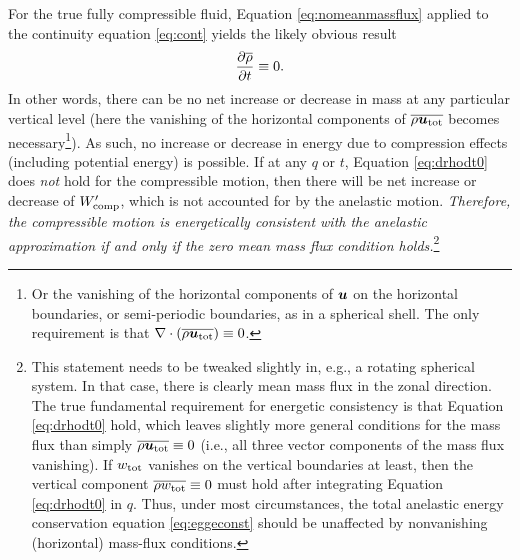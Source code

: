 \documentclass[12pt]{article}
\newcommand{\utot}{{\vecu}_{\rm tot}}
\newcommand{\uwtot}{w_{\rm tot}}
\newcommand{\wpcomp}{W^\prime_{\rm comp}}
\begin{document}
For the true fully compressible fluid, Equation \eqref{eq:nomeanmassflux} applied to the continuity equation \eqref{eq:cont} yields the likely obvious result
\begin{align}\label{eq:drhodt0}
	\frac{\partial\overline{\rho}}{\partial t}\equiv0.
\end{align}
In other words, there can be no net increase or decrease in mass at any particular vertical level (here the vanishing of the horizontal components of $\overline{\rho\utot}$ becomes necessary\footnote{Or the vanishing of the horizontal components of $\bm{u}$ on the horizontal boundaries, or semi-periodic boundaries, as in a spherical shell. The only requirement is that $\Div(\overline{\rho\utot})\equiv0$.}). As such, no increase or decrease in energy due to compression effects (including potential energy) is possible. If at any $q$ or $t$, Equation \eqref{eq:drhodt0} does \textit{not} hold for the compressible motion, then there will be net increase or decrease of $\wpcomp$, which is not accounted for by the anelastic motion. \textit{Therefore, the compressible motion is energetically consistent with the anelastic approximation if and only if the zero mean mass flux condition holds.}\footnote{This statement needs to be tweaked slightly in, e.g., a rotating spherical system. In that case, there is clearly mean mass flux in the zonal direction. The true fundamental requirement for energetic consistency is that Equation \eqref{eq:drhodt0} hold, which leaves slightly more general conditions for the mass flux than simply $\overline{\rho\utot}\equiv0$ (i.e., all three vector components of the mass flux vanishing). If $\uwtot$ vanishes on the vertical boundaries at least, then the vertical component $\overline{\rho \uwtot}\equiv0$ must hold after integrating Equation \eqref{eq:drhodt0} in $q$. Thus, under most circumstances, the total anelastic energy conservation equation \eqref{eq:eggeconst} should be unaffected by nonvanishing (horizontal) mass-flux conditions.}
\end{document}
